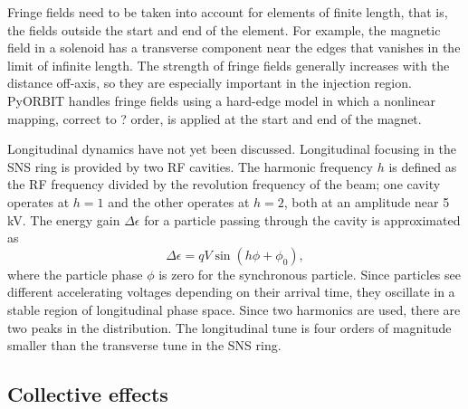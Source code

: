Fringe fields need to be taken into account for elements of finite length, that is, the fields outside the start and end of the element. For example, the magnetic field in a solenoid has a transverse component near the edges that vanishes in the limit of infinite length. The strength of fringe fields generally increases with the distance off-axis, so they are especially important in the injection region. PyORBIT handles fringe fields using a hard-edge model in which a nonlinear mapping, correct to ? order, is applied at the start and end of the magnet.

Longitudinal dynamics have not yet been discussed. Longitudinal focusing in the SNS ring is provided by two RF cavities. The harmonic frequency $h$ is defined as the RF frequency divided by the revolution frequency of the beam; one cavity operates at $h = 1$ and the other operates at $h = 2$, both at an amplitude near 5 kV. The energy gain $\Delta \epsilon$ for a particle passing through the cavity is approximated as  
%
\begin{equation}\label{eq:RF}
    \Delta \epsilon = q V \sin(h \phi + \phi_0),
\end{equation}
%
where the particle phase $\phi$ is zero for the synchronous particle. Since particles see different accelerating voltages depending on their arrival time, they oscillate in a stable region of longitudinal phase space. Since two harmonics are used, there are two peaks in the distribution. The longitudinal tune is four orders of magnitude smaller than the transverse tune in the SNS ring. 



\subsection{Collective effects}

